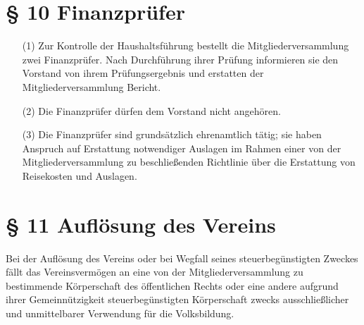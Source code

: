 \documentclass[12pt,paper=a4,ngerman]{scrreprt}
\begin{document}
\section{\S{} 10 Finanzprüfer}

\begin{itemize}
\item[(1)]
Zur Kontrolle der Haushaltsführung bestellt die Mitgliederversammlung
zwei Finanzprüfer. Nach Durchführung ihrer Prüfung informieren sie den
Vorstand von ihrem Prüfungsergebnis und erstatten der
Mitgliederversammlung Bericht.
\item[(2)]
Die Finanzprüfer dürfen dem Vorstand nicht angehören.
\item[(3)]
Die Finanzprüfer sind grundsätzlich ehrenamtlich tätig; sie haben
Anspruch auf Erstattung notwendiger Auslagen im Rahmen einer von der
Mitgliederversammlung zu beschließenden Richtlinie über die Erstattung
von Reisekosten und Auslagen.
\end{itemize}

\section{\S{} 11 Auflösung des Vereins}
Bei der Auflösung des Vereins oder bei Wegfall seines steuerbegünstigten Zweckes fällt
das Vereinsvermögen an eine von der Mitgliederversammlung zu
bestimmende Körperschaft des öffentlichen Rechts oder eine andere
aufgrund ihrer Gemeinnützigkeit steuerbegünstigten Körperschaft zwecks
ausschließlicher und unmittelbarer Verwendung für die Volksbildung.
\end{document}
